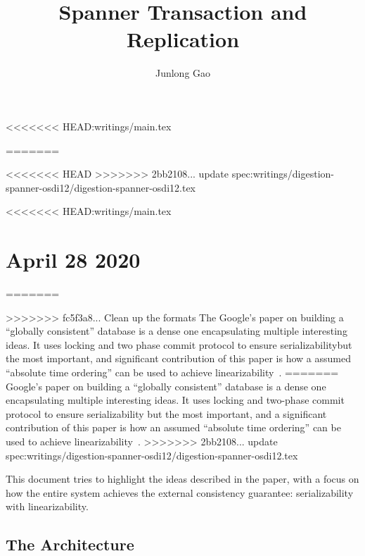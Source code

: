 <<<<<<< HEAD:writings/main.tex


=======

%

<<<<<<< HEAD
\newcommand{\Lconsistent}{linearizability}
\newcommand{\Sconsistent}{serializability}
\newcommand{\LConsistent}{Linearizability}
\newcommand{\SConsistent}{Serializability}
>>>>>>> 2bb2108... update spec:writings/digestion-spanner-osdi12/digestion-spanner-osdi12.tex


\tableofcontents

<<<<<<< HEAD:writings/main.tex
\chapter{April 28 2020}
=======
\author{Junlong Gao}

\tableofcontents

\title{Spanner Transaction and Replication}
\maketitle

>>>>>>> fc5f3a8... Clean up the formats
The Google's paper on building a ``globally consistent'' database
is a dense one encapsulating multiple interesting ideas. It uses locking
and two phase commit protocol to ensure \Sconsistent but the most
important, and significant contribution of this paper is how a assumed
``absolute time ordering'' can be used to achieve \Lconsistent~\cite{Cooper_2013}.
=======
Google's paper on building a ``globally consistent'' database is a dense one
encapsulating multiple interesting ideas. It uses locking and two-phase
commit protocol to ensure {\Sconsistent} but the most important, and
a significant contribution of this paper is how an assumed ``absolute time
ordering'' can be used to achieve {\Lconsistent}~\cite{Cooper_2013}.
>>>>>>> 2bb2108... update spec:writings/digestion-spanner-osdi12/digestion-spanner-osdi12.tex

This document tries to highlight the ideas described in the paper,
with a focus on how the entire system achieves the external consistency
guarantee: {\Sconsistent} with {\Lconsistent}.

\section{The Architecture}
